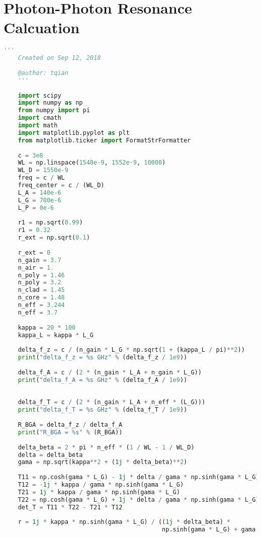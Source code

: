 \section{Photon-Photon Resonance Calcuation}\label{sec:PP_resonance_cal}

\begin{lstlisting}[language=Python, basicstyle=\tiny]
    '''
    Created on Sep 12, 2018
    
    @author: tqian
    '''
    
    import scipy
    import numpy as np
    from numpy import pi
    import cmath
    import math
    import matplotlib.pyplot as plt
    from matplotlib.ticker import FormatStrFormatter
    
    c = 3e8
    WL = np.linspace(1548e-9, 1552e-9, 10000)
    WL_D = 1550e-9
    freq = c / WL
    freq_center = c / (WL_D)
    L_A = 140e-6
    L_G = 780e-6
    L_P = 0e-6
    
    r1 = np.sqrt(0.99)
    r1 = 0.32
    r_ext = np.sqrt(0.1)
    
    r_ext = 0
    n_gain = 3.7
    n_air = 1.
    n_poly = 1.46
    n_poly = 3.2
    n_clad = 1.45
    n_core = 1.48
    n_eff = 3.244
    n_eff = 3.7
    
    kappa = 20 * 100
    kappa_L = kappa * L_G
    
    delta_f_z = c / (n_gain * L_G * np.sqrt(1 + (kappa_L / pi)**2))
    print("delta_f_z = %s GHz" % (delta_f_z / 1e9))
    
    delta_f_A = c / (2 * (n_gain * L_A + n_gain * L_G))
    print("delta_f_A = %s GHz" % (delta_f_A / 1e9))
    
    
    delta_f_T = c / (2 * (n_gain * L_A + n_eff * (L_G)))
    print("delta_f_T = %s GHz" % (delta_f_T / 1e9))
    
    R_BGA = delta_f_z / delta_f_A
    print("R_BGA = %s" % (R_BGA))
    
    delta_beta = 2 * pi * n_eff * (1 / WL - 1 / WL_D)
    delta = delta_beta
    gama = np.sqrt(kappa**2 + (1j * delta_beta)**2)
    
    T11 = np.cosh(gama * L_G) - 1j * delta / gama * np.sinh(gama * L_G)
    T12 = -1j * kappa / gama * np.sinh(gama * L_G)
    T21 = 1j * kappa / gama * np.sinh(gama * L_G)
    T22 = np.cosh(gama * L_G) + 1j * delta / gama * np.sinh(gama * L_G)
    det_T = T11 * T22 - T21 * T12
    
    r = 1j * kappa * np.sinh(gama * L_G) / ((1j * delta_beta) *
                                            np.sinh(gama * L_G) + gama * np.cosh(gama * L_G))
    

\end{lstlisting}
